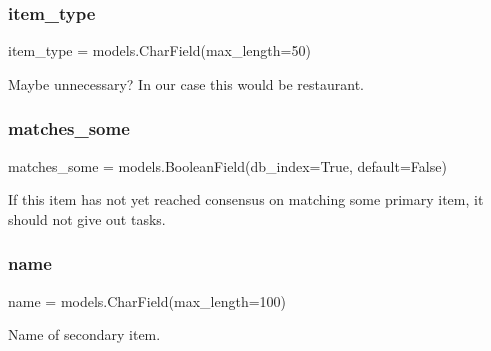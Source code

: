 \mbox{\label{classjoinapp_1_1models_1_1items_1_1_secondary_item_a2679318a14061852e50df3c6e4e42f62}} 
\subsubsection{\texorpdfstring{item\_type}{item\_type}}
{\footnotesize\ttfamily item\+\_\+type = models.\+Char\+Field(max\+\_\+length=50)\hspace{0.3cm}{\ttfamily [static]}}



Maybe unnecessary? In our case this would be restaurant. 

\mbox{\label{classjoinapp_1_1models_1_1items_1_1_secondary_item_a41c32ad76aa5a218929d37bec5e8f271}} 
\subsubsection{\texorpdfstring{matches\_some}{matches\_some}}
{\footnotesize\ttfamily matches\+\_\+some = models.\+Boolean\+Field(db\+\_\+index=True, default=False)\hspace{0.3cm}{\ttfamily [static]}}



If this item has not yet reached consensus on matching some primary item, it should not give out tasks. 

\mbox{\label{classjoinapp_1_1models_1_1items_1_1_secondary_item_ab74e6bf80237ddc4109968cedc58c151}} 
\subsubsection{\texorpdfstring{name}{name}}
{\footnotesize\ttfamily name = models.\+Char\+Field(max\+\_\+length=100)\hspace{0.3cm}{\ttfamily [static]}}



Name of secondary item. 

